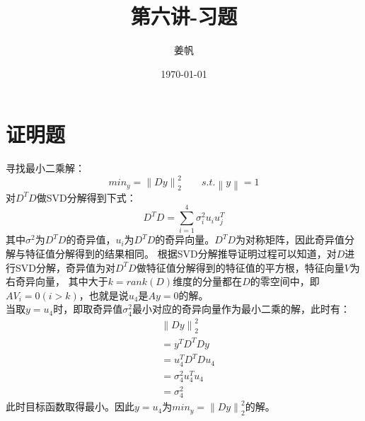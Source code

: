 \documentclass[UTF8]{ctexart}
\title{第六讲-习题}
\author{姜帆}
\date{\today}
\begin{document}
\maketitle
\tableofcontents
\newpage
\section{证明题}
\indent 寻找最小二乘解：
\begin{equation}
{min}_y = \left\|Dy\right\|_2^2  \qquad s.t.\left\|y\right\|=1
\end{equation}
\indent 对$D^TD$做SVD分解得到下式：
\begin{equation}
D^TD = \sum_{i=1}^4\sigma^2_iu_iu_j^T
\end{equation}
\indent 其中$\sigma^2$为$D^TD$的奇异值，$u_i$为$D^TD$的奇异向量。$D^TD$为对称矩阵，因此奇异值分解与特征值分解得到的结果相同。
根据SVD分解推导证明过程可以知道，对$D$进行SVD分解，奇异值为对$D^TD$做特征值分解得到的特征值的平方根，特征向量$V$为右奇异向量，
其中大于$k=rank(D)$维度的分量都在$D$的零空间中，即$AV_i=0(i>k)$，也就是说$u_4$是$Ay=0$的解。\\
\indent 当取$y=u_4$时，即取奇异值$\sigma^2_4$最小对应的奇异向量作为最小二乘的解，此时有：
\begin{equation}
\begin{aligned}
& \left\|Dy\right\|_2^2 \\
&=y^TD^TDy\\
&=u_4^TD^TDu_4\\
&=\sigma^2_4u_4^Tu_4\\
&=\sigma^2_4
\end{aligned}
\end{equation}
\indent 此时目标函数取得最小。因此$y=u_4$为${min}_y = \left\|Dy\right\|_2^2 $的解。\\
\newpage
\end{document}
